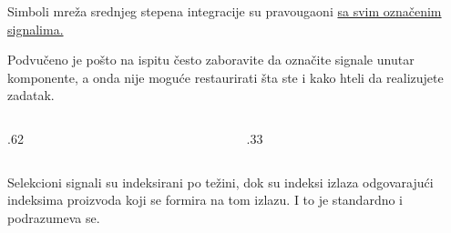 \begin{frame}[label=03-s007]
\gusttekst
Simboli mreža srednjeg stepena integracije su pravougaoni \underline{sa svim označenim signalima.}

Podvučeno je pošto na ispitu često zaboravite da označite signale unutar komponente, a onda nije moguće restaurirati šta ste i kako hteli da realizujete zadatak.
\begingroup
\def\DEcs{0}\def\DEokvir{1}\def\DEnaziv{Dekoder}\def\DEtip{2/4}
\begin{columns}[c,onlytextwidth]
\begin{column}{.62\textwidth}\centering

\end{column}
\begin{column}{.33\textwidth}\centering

\end{column}
\end{columns}
\endgroup
Selekcioni signali su indeksirani po težini, dok su indeksi izlaza odgovarajući indeksima proizvoda koji se formira na tom izlazu. I to je standardno i podrazumeva se.
\end{frame}
